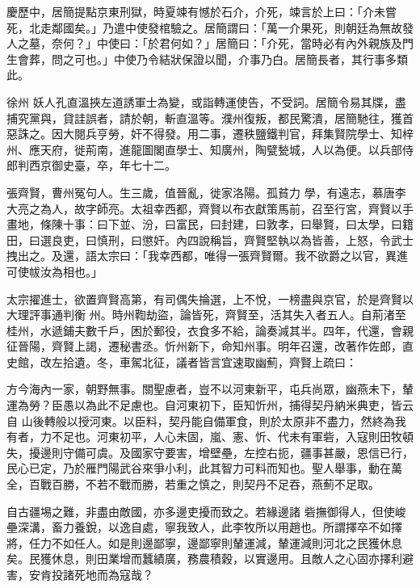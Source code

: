 \begin{pinyinscope}
 慶歷中，居簡提點京東刑獄，時夏竦有憾於石介，介死，竦言於上曰：「介未嘗死，北走鄰國矣。」乃遣中使發棺驗之。居簡謂曰：「萬一介果死，則朝廷為無故發人之墓，奈何？」中使曰：「於君何如？」居簡曰：「介死，當時必有內外親族及門生會葬，問之可也。」中使乃令結狀保證以聞，介事乃白。居簡長者，其行事多類此。



 徐州
 妖人孔直溫挾左道誘軍士為變，或詣轉運使告，不受詞。居簡令易其牒，盡捕究黨與，貸詿誤者，請於朝，斬直溫等。濮州復叛，都民驚潰，居簡馳往，獲首惡誅之。因大閱兵亨勞，奸不得發。用二事，遷秩鹽鐵判官，拜集賢院學士、知梓州、應天府，徙荊南，進龍圖閣直學士、知廣州，陶甓甃城，人以為便。以兵部侍郎判西京御史臺，卒，年七十二。



 張齊賢，曹州冤句人。生三歲，值晉亂，徙家洛陽。孤貧力
 學，有遠志，慕唐李大亮之為人，故字師亮。太祖幸西都，齊賢以布衣獻策馬前，召至行宮，齊賢以手畫地，條陳十事：曰下並、汾，曰富民，曰封建，曰敦孝，曰舉賢，曰太學，曰籍田，曰選良吏，曰慎刑，曰懲奸。內四說稱旨，齊賢堅執以為皆善，上怒，令武士拽出之。及還，語太宗曰：「我幸西都，唯得一張齊賢爾。我不欲爵之以官，異進可使帗汝為相也。」



 太宗擢進士，欲置齊賢高第，有司偶失掄選，上不悅，一榜盡與京官，於是齊賢以大理評事通判衡
 州。時州鞫劫盜，論皆死，齊賢至，活其失入者五人。自荊渚至桂州，水遞鋪夫數千戶，困於郵役，衣食多不給，論奏減其半。四年，代還，會親征晉陽，齊賢上謁，遷秘書丞。忻州新下，命知州事。明年召還，改著作佐郎，直史館，改左拾遺。冬，車駕北征，議者皆言宜速取幽薊，齊賢上疏曰：



 方今海內一家，朝野無事。關聖慮者，豈不以河東新平，屯兵尚眾，幽燕未下，輦運為勞？臣愚以為此不足慮也。自河東初下，臣知忻州，捕得契丹納米典吏，皆云自
 山後轉般以授河東。以臣料，契丹能自備軍食，則於太原非不盡力，然終為我有者，力不足也。河東初平，人心未固，嵐、憲、忻、代未有軍砦，入寇則田牧頓失，擾邊則守備可虞。及國家守要害，增壁壘，左控右扼，疆事甚嚴，恩信已行，民心已定，乃於雁門陽武谷來爭小利，此其智力可料而知也。聖人舉事，動在萬全，百戰百勝，不若不戰而勝，若重之慎之，則契丹不足吞，燕薊不足取。



 自古疆埸之難，非盡由敵國，亦多邊吏擾而致之。若緣邊諸
 砦撫御得人，但使峻壘深溝，畜力養銳，以逸自處，寧我致人，此李牧所以用趙也。所謂擇卒不如擇將，任力不如任人。如是則邊鄙寧，邊鄙寧則輦運減，輦運減則河北之民獲休息矣。民獲休息，則田業增而蠶績廣，務農積穀，以實邊用。且敵人之心固亦擇利避害，安肯投諸死地而為寇哉？




\end{pinyinscope}
